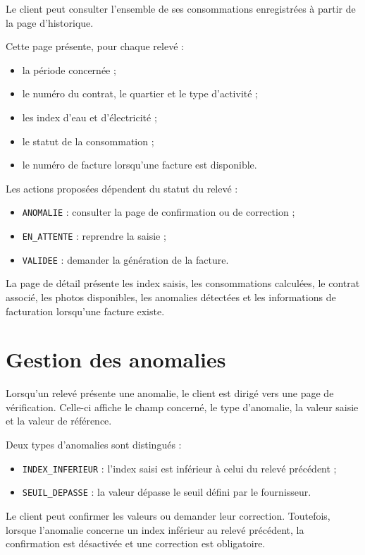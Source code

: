 Le client peut consulter l'ensemble de ses consommations enregistrées à partir de la page d'historique.

Cette page présente, pour chaque relevé :
\begin{itemize}
    \item la période concernée ;
    \item le numéro du contrat, le quartier et le type d'activité ;
    \item les index d'eau et d'électricité ;
    \item le statut de la consommation ;
    \item le numéro de facture lorsqu'une facture est disponible.
\end{itemize}

Les actions proposées dépendent du statut du relevé :
\begin{itemize}
    \item \texttt{ANOMALIE} : consulter la page de confirmation ou de correction ;
    \item \texttt{EN\_ATTENTE} : reprendre la saisie ;
    \item \texttt{VALIDEE} : demander la génération de la facture.
\end{itemize}

La page de détail présente les index saisis, les consommations calculées, le contrat associé, les photos disponibles, les anomalies détectées et les informations de facturation lorsqu'une facture existe.

\section{Gestion des anomalies}

Lorsqu'un relevé présente une anomalie, le client est dirigé vers une page de vérification. Celle-ci affiche le champ concerné, le type d'anomalie, la valeur saisie et la valeur de référence.

Deux types d'anomalies sont distingués :
\begin{itemize}
    \item \texttt{INDEX\_INFERIEUR} : l'index saisi est inférieur à celui du relevé précédent ;
    \item \texttt{SEUIL\_DEPASSE} : la valeur dépasse le seuil défini par le fournisseur.
\end{itemize}

Le client peut confirmer les valeurs ou demander leur correction. Toutefois, lorsque l'anomalie concerne un index inférieur au relevé précédent, la confirmation est désactivée et une correction est obligatoire.

